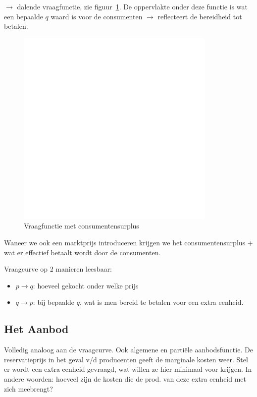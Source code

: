 $\rightarrow$ dalende vraagfunctie, zie figuur~\ref{fig:vraagfunc}. De oppervlakte onder deze functie is wat een bepaalde $q$ waard is voor de consumenten $\rightarrow$ reflecteert de bereidheid tot betalen.
\begin{figure}[htbp]
	\centering
	\includegraphics[scale=0.4]{Images/white.png}
	\caption{Vraagfunctie met consumentensurplus}
	\label{fig:vraagfunc}
\end{figure}

Waneer we ook een marktprijs introduceren krijgen we het consumentensurplus + wat er effectief betaalt wordt door de consumenten. 

Vraagcurve op 2 manieren leesbaar:
\begin{itemize}
	\item $p \rightarrow q$: hoeveel gekocht onder welke prijs
    \item $q \rightarrow p$: bij bepaalde $q$, wat is men bereid te betalen voor een extra eenheid.
\end{itemize}

\subsection{Het Aanbod}
Volledig analoog aan de vraagcurve. Ook algemene en parti\"{e}le aanbodsfunctie. De reservatieprijs in het geval v/d producenten geeft de marginale kosten weer. Stel er wordt een extra eenheid gevraagd, wat willen ze hier minimaal voor krijgen. In andere woorden: hoeveel zijn de kosten die de prod. van deze extra eenheid met zich meebrengt?

